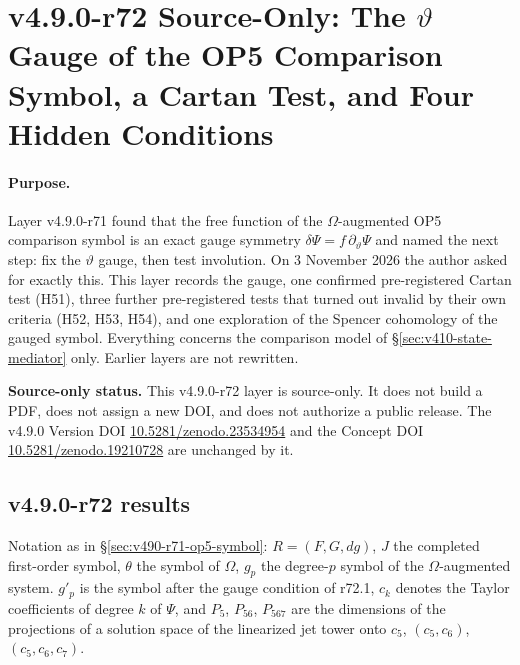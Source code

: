 \clearpage
\section*{v4.9.0-r72 Source-Only: The \texorpdfstring{\(\vartheta\)}{theta} Gauge of the OP5 Comparison Symbol, a Cartan Test, and Four Hidden Conditions}
\label{sec:v490-r72-theta-gauge}

\paragraph{Purpose.}
Layer v4.9.0-r71 found that the free function of the \(\Omega\)-augmented OP5 comparison symbol is an exact gauge symmetry
\(\delta\Psi=f\,\partial_\vartheta\Psi\) and named the next step: fix the \(\vartheta\) gauge, then test involution.  On
3 November 2026 the author asked for exactly this.  This layer records the gauge, one confirmed pre-registered Cartan test
(H51), three further pre-registered tests that turned out invalid by their own criteria (H52, H53, H54), and one exploration of
the Spencer cohomology of the gauged symbol.  Everything concerns the comparison model of \S\ref{sec:v410-state-mediator}
only.  Earlier layers are not rewritten.

\noindent\textbf{Source-only status.}
This v4.9.0-r72 layer is source-only.  It does not build a PDF, does not assign a new DOI,
and does not authorize a public release.  The v4.9.0 Version DOI
\href{https://doi.org/10.5281/zenodo.23534954}{10.5281/zenodo.23534954} and the Concept DOI
\href{https://doi.org/10.5281/zenodo.19210728}{10.5281/zenodo.19210728} are unchanged by it.

\subsection*{v4.9.0-r72 results}
\label{subsec:v490-r72-results}

Notation as in \S\ref{sec:v490-r71-op5-symbol}: \(R=(F,G,dg)\), \(J\) the completed first-order symbol, \(\theta\) the
symbol of \(\Omega\), \(g_p\) the degree-\(p\) symbol of the \(\Omega\)-augmented system.  \(g'_p\) is the symbol after the
gauge condition of r72.1, \(c_k\) denotes the Taylor coefficients of degree \(k\) of \(\Psi\), and \(P_{5}\), \(P_{56}\),
\(P_{567}\) are the dimensions of the projections of a solution space of the linearized jet tower onto \(c_5\),
\((c_5,c_6)\), \((c_5,c_6,c_7)\).


